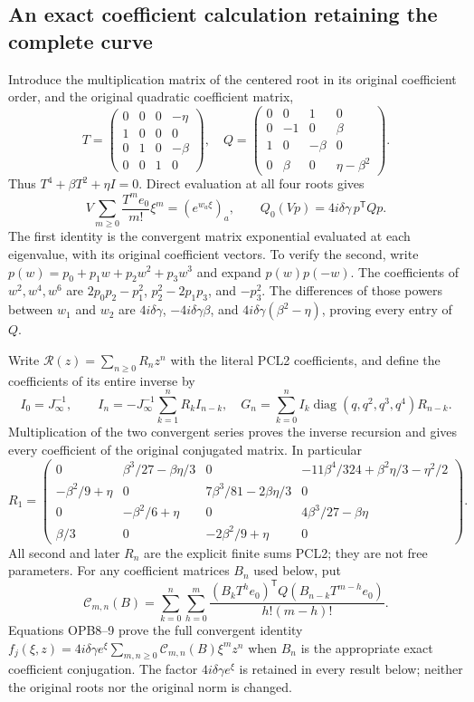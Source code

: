 \subsection{An exact coefficient calculation retaining the complete curve}
Introduce the multiplication matrix of the centered root in its original
coefficient order, and the original quadratic coefficient matrix,
\[
 T=\begin{pmatrix}0&0&0&-\eta\\1&0&0&0\\0&1&0&-\beta\\0&0&1&0\end{pmatrix},
 \quad
 Q=\begin{pmatrix}0&0&1&0\\0&-1&0&\beta\\1&0&-\beta&0\\
                    0&\beta&0&\eta-\beta^2\end{pmatrix}.
 \tag{OPB7}
\]
Thus $T^4+\beta T^2+\eta I=0$. Direct evaluation at all four roots gives
\[
 V\sum_{m\ge0}\frac{T^me_0}{m!}\xi^m=(e^{w_a\xi})_a,
 \qquad Q_0(Vp)=4i\delta\gamma\,p^{\mathsf T}Qp.
 \tag{OPB8}
\]
The first identity is the convergent matrix exponential evaluated at
each eigenvalue, with its original coefficient vectors. To verify the
second, write $p(w)=p_0+p_1w+p_2w^2+p_3w^3$ and expand
$p(w)p(-w)$. The coefficients of $w^2,w^4,w^6$ are
$2p_0p_2-p_1^2$, $p_2^2-2p_1p_3$, and $-p_3^2$.
The differences of those powers between $w_1$ and $w_2$ are
$4i\delta\gamma$, $-4i\delta\gamma\beta$, and
$4i\delta\gamma(\beta^2-\eta)$, proving every entry of $Q$.

Write $\mathcal R(z)=\sum_{n\ge0}R_nz^n$ with the literal PCL2
coefficients, and define the coefficients of its entire inverse by
\[
 I_0=J_\infty^{-1},\qquad
 I_n=-J_\infty^{-1}\sum_{k=1}^nR_k I_{n-k},\quad
 G_n=\sum_{k=0}^n I_k\operatorname{diag}(q,q^2,q^3,q^4)R_{n-k}.
 \tag{OPB9}
\]
Multiplication of the two convergent series proves the inverse recursion
and gives every coefficient of the original conjugated matrix.
In particular
\[
 R_1=\begin{pmatrix}
 0&\beta^3/27-\beta\eta/3&0&-11\beta^4/324+\beta^2\eta/3-\eta^2/2\\
 -\beta^2/9+\eta&0&7\beta^3/81-2\beta\eta/3&0\\
 0&-\beta^2/6+\eta&0&4\beta^3/27-\beta\eta\\
 \beta/3&0&-2\beta^2/9+\eta&0
 \end{pmatrix}.
 \tag{OPB10}
\]
All second and later $R_n$ are the explicit finite sums PCL2; they are
not free parameters. For any coefficient matrices $B_n$ used below, put
\[
 \mathcal C_{m,n}(B)=
 \sum_{k=0}^n\sum_{h=0}^m
 \frac{(B_k T^he_0)^{\mathsf T}Q(B_{n-k}T^{m-h}e_0)}{h!(m-h)!}.
 \tag{OPB11}
\]
Equations OPB8--9 prove the full convergent identity
$f_j(\xi,z)=4i\delta\gamma e^\xi
\sum_{m,n\ge0}\mathcal C_{m,n}(B)\xi^mz^n$
when $B_n$ is the appropriate exact coefficient conjugation.
The factor $4i\delta\gamma e^\xi$ is retained in every result below;
neither the original roots nor the original norm is changed.


